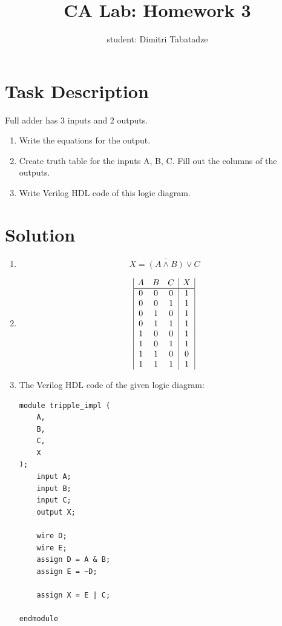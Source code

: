 \documentclass{article}
\title{CA Lab: Homework 3}
\author{student: Dimitri Tabatadze}
\begin{document}
    \maketitle

    \section*{Task Description}

    Full adder has 3 inputs and 2 outputs. 
    
    \begin{enumerate}[label={\alph*)}]
        \item Write the equations for the output.
        \item Create truth table for the inputs A, B, C. Fill out the columns of the outputs.
        \item Write Verilog HDL code of this logic diagram. 
    \end{enumerate}

    \section*{Solution}
    
    \begin{enumerate}[label={\alph*)}]
        \item \begin{displaymath}
            X = \overline{(A \land B)} \lor C
        \end{displaymath}
        \item \begin{displaymath}
            \begin{array}{|c c c | c |}
                A & B & C & X \\
                \hline
                0 & 0 & 0 & 1 \\
                0 & 0 & 1 & 1 \\
                0 & 1 & 0 & 1 \\
                0 & 1 & 1 & 1 \\
                1 & 0 & 0 & 1 \\
                1 & 0 & 1 & 1 \\
                1 & 1 & 0 & 0 \\
                1 & 1 & 1 & 1 \\
            \end{array}
        \end{displaymath}
        \item The Verilog HDL code of the given logic diagram:
        \begin{lstlisting}
module tripple_impl (
    A,
    B,
    C,
    X
);
    input A;
    input B;
    input C;
    output X;

    wire D;
    wire E;
    assign D = A & B;
    assign E = ~D;
    
    assign X = E | C;

endmodule
        \end{lstlisting}
    \end{enumerate}
\end{document}
